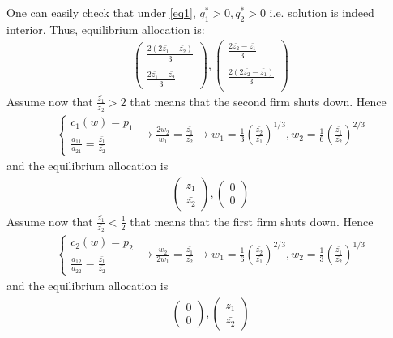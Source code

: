 \documentclass[a4paper]{article}
\begin{document}
One can easily check that under \eqref{eq1}, $q_1^* > 0, q_2^* > 0$ i.e. solution is indeed interior. Thus, equilibrium allocation is:
\begin{align*}
\begin{pmatrix}
\frac{2(2\bar{z_1} - \bar{z_2})}{3}\\
\\
\frac{2\bar{z_1} - \bar{z_2}}{3}
\end{pmatrix}, \begin{pmatrix}
\frac{2\bar{z_2} - \bar{z_1}}{3}\\
\\
\frac{2(2\bar{z_2} - \bar{z_1})}{3}\\
\end{pmatrix}
\end{align*}
Assume now that $\frac{\bar{z_1}}{\bar{z_2}} > 2$ that means that the second firm shuts down. Hence
\begin{align*}
\begin{cases}
c_1(w) = p_1\\
\frac{a_{11}}{a_{21}} = \frac{\bar{z_1}}{\bar{z_2}}
\end{cases} \to \frac{2w_2}{w_1} = \frac{\bar{z_1}}{\bar{z_2}} \to w_1 = \frac{1}{3}\left(\frac{\bar{z_2}}{\bar{z_1}}\right)^{1/3}, w_2 = \frac{1}{6}\left(\frac{\bar{z_1}}{\bar{z_2}}\right)^{2/3}
\end{align*}
and the equilibrium allocation is
\begin{align*}
\begin{pmatrix}
\bar{z_1}\\
\bar{z_2}
\end{pmatrix}, \begin{pmatrix}
0\\
0
\end{pmatrix}
\end{align*}
Assume now that $\frac{\bar{z_1}}{\bar{z_2}} < \frac{1}{2}$ that means that the first firm shuts down. Hence
\begin{align*}
\begin{cases}
c_2(w) = p_2\\
\frac{a_{12}}{a_{22}} = \frac{\bar{z_1}}{\bar{z_2}}
\end{cases} \to \frac{w_2}{2w_1} = \frac{\bar{z_1}}{\bar{z_2}} \to w_1 = \frac{1}{6}\left(\frac{\bar{z_2}}{\bar{z_1}}\right)^{2/3}, w_2 = \frac{1}{3}\left(\frac{\bar{z_1}}{\bar{z_2}}\right)^{1/3}
\end{align*}
and the equilibrium allocation is
\begin{align*}
\begin{pmatrix}
0\\
0
\end{pmatrix},
\begin{pmatrix}
\bar{z_1}\\
\bar{z_2}
\end{pmatrix}
\end{align*}
\end{document}
